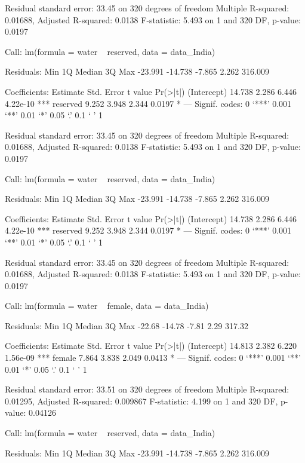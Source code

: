 Residual standard error: 33.45 on 320 degrees of freedom
Multiple R-squared:  0.01688,	Adjusted R-squared:  0.0138 
F-statistic: 5.493 on 1 and 320 DF,  p-value: 0.0197


Call:
lm(formula = water ~ reserved, data = data_India)

Residuals:
    Min      1Q  Median      3Q     Max 
-23.991 -14.738  -7.865   2.262 316.009 

Coefficients:
            Estimate Std. Error t value Pr(>|t|)    
(Intercept)   14.738      2.286   6.446 4.22e-10 ***
reserved       9.252      3.948   2.344   0.0197 *  
---
Signif. codes:  0 ‘***’ 0.001 ‘**’ 0.01 ‘*’ 0.05 ‘.’ 0.1 ‘ ’ 1

Residual standard error: 33.45 on 320 degrees of freedom
Multiple R-squared:  0.01688,	Adjusted R-squared:  0.0138 
F-statistic: 5.493 on 1 and 320 DF,  p-value: 0.0197


Call:
lm(formula = water ~ reserved, data = data_India)

Residuals:
    Min      1Q  Median      3Q     Max 
-23.991 -14.738  -7.865   2.262 316.009 

Coefficients:
            Estimate Std. Error t value Pr(>|t|)    
(Intercept)   14.738      2.286   6.446 4.22e-10 ***
reserved       9.252      3.948   2.344   0.0197 *  
---
Signif. codes:  0 ‘***’ 0.001 ‘**’ 0.01 ‘*’ 0.05 ‘.’ 0.1 ‘ ’ 1

Residual standard error: 33.45 on 320 degrees of freedom
Multiple R-squared:  0.01688,	Adjusted R-squared:  0.0138 
F-statistic: 5.493 on 1 and 320 DF,  p-value: 0.0197


Call:
lm(formula = water ~ female, data = data_India)

Residuals:
   Min     1Q Median     3Q    Max 
-22.68 -14.78  -7.81   2.29 317.32 

Coefficients:
            Estimate Std. Error t value Pr(>|t|)    
(Intercept)   14.813      2.382   6.220 1.56e-09 ***
female         7.864      3.838   2.049   0.0413 *  
---
Signif. codes:  0 ‘***’ 0.001 ‘**’ 0.01 ‘*’ 0.05 ‘.’ 0.1 ‘ ’ 1

Residual standard error: 33.51 on 320 degrees of freedom
Multiple R-squared:  0.01295,	Adjusted R-squared:  0.009867 
F-statistic: 4.199 on 1 and 320 DF,  p-value: 0.04126


Call:
lm(formula = water ~ reserved, data = data_India)

Residuals:
    Min      1Q  Median      3Q     Max 
-23.991 -14.738  -7.865   2.262 316.009 

